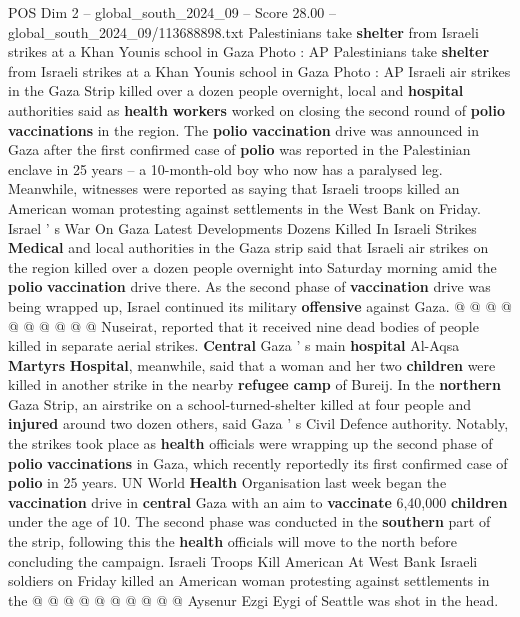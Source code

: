 \begin{textsample}{POS Dim 2 – global\_south\_2024\_09 – Score 28.00 – global\_south\_2024\_09/113688898.txt}  \label{ex:f2_pos_192}
Palestinians take \textbf{shelter} from Israeli strikes at a Khan Younis school in Gaza Photo : AP Palestinians take \textbf{shelter} from Israeli strikes at a Khan Younis school in Gaza Photo : AP Israeli air strikes in the Gaza Strip killed over a dozen people overnight, local and \textbf{hospital} authorities said as \textbf{health} \textbf{workers} worked on closing the second round of \textbf{polio} \textbf{vaccinations} in the region.
The \textbf{polio} \textbf{vaccination} drive was announced in Gaza after the first confirmed case of \textbf{polio} was reported in the Palestinian enclave in 25 years -- a 10-month-old boy who now has a paralysed leg.
Meanwhile, witnesses were reported as saying that Israeli troops killed an American woman protesting against settlements in the West Bank on Friday.
Israel ' s War On Gaza Latest Developments Dozens Killed In Israeli Strikes \textbf{Medical} and local authorities in the Gaza strip said that Israeli air strikes on the region killed over a dozen people overnight into Saturday morning amid the \textbf{polio} \textbf{vaccination} drive there.
As the second phase of \textbf{vaccination} drive was being wrapped up, Israel continued its military \textbf{offensive} against Gaza. @ @ @ @ @ @ @ @ @ @ Nuseirat, reported that it received nine dead bodies of people killed in separate aerial strikes. \textbf{Central} Gaza ' s main \textbf{hospital} Al-Aqsa \textbf{Martyrs} \textbf{Hospital}, meanwhile, said that a woman and her two \textbf{children} were killed in another strike in the nearby \textbf{refugee} \textbf{camp} of Bureij.
In the \textbf{northern} Gaza Strip, an airstrike on a school-turned-shelter killed at four people and \textbf{injured} around two dozen others, said Gaza ' s Civil Defence authority.
Notably, the strikes took place as \textbf{health} officials were wrapping up the second phase of \textbf{polio} \textbf{vaccinations} in Gaza, which recently reportedly its first confirmed case of \textbf{polio} in 25 years.
UN World \textbf{Health} Organisation last week began the \textbf{vaccination} drive in \textbf{central} Gaza with an aim to \textbf{vaccinate} 6,40,000 \textbf{children} under the age of 10.
The second phase was conducted in the \textbf{southern} part of the strip, following this the \textbf{health} officials will move to the north before concluding the campaign.
Israeli Troops Kill American At West Bank Israeli soldiers on Friday killed an American woman protesting against settlements in the @ @ @ @ @ @ @ @ @ @ Aysenur Ezgi Eygi of Seattle was shot in the head.

\end{textsample}
